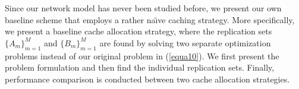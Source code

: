 \documentclass[10pt,journal,compsoc,onecolumn]{IEEEtran}
\begin{document}
Since our network model has never been studied before, we present our own baseline scheme that employs a rather na\"{\i}ve caching strategy. More specifically, we present a baseline cache
allocation strategy, where the replication sets ${\lbrace A_m
\rbrace}^M_{m=1}$ and ${\lbrace B_m \rbrace}^M_{m=1}$ are found by
solving two separate optimization problems instead of our original
problem in (\ref{equa10}). We first present the problem
formulation and then find the individual replication sets.
Finally, performance comparison is conducted between two cache
allocation strategies.
\begin{figure}[t!]
    \centering
\end{figure}
\end{document}
